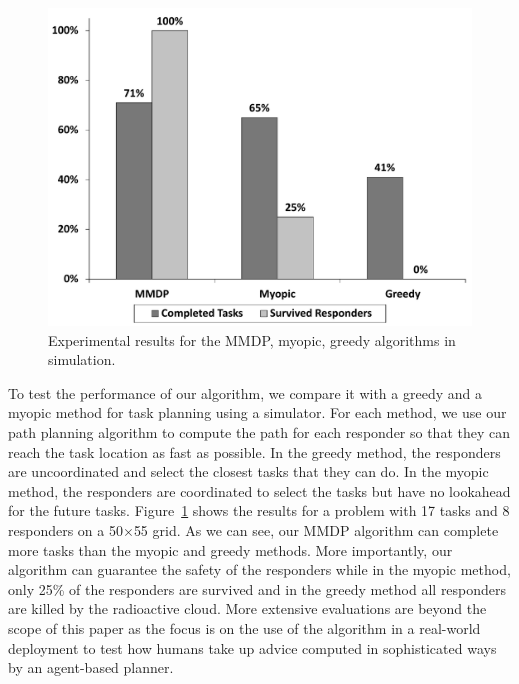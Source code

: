 \begin{figure}[htbp]
  \centering
  \includegraphics[width=0.8\linewidth]{simulation}
  \caption{Experimental results for the MMDP, myopic, greedy
  algorithms in simulation.}
  \label{fig:simulation}
\end{figure}

\noindent To test the performance of our algorithm, we compare it
with a greedy and a myopic method for task planning using a
simulator. For each method, we use our path planning algorithm to
compute the path for each responder so that they can reach the task
location as fast as possible. In the greedy method, the responders
are uncoordinated and select the closest tasks that they can do. In
the myopic method, the responders are coordinated to select the
tasks but have no lookahead for the future tasks.
Figure~\ref{fig:simulation} shows the results for a problem with 17
tasks and 8 responders on a 50$\times$55 grid. As we can see, our
MMDP algorithm can complete more tasks than the myopic and greedy
methods. More importantly, our algorithm can guarantee the safety
of the responders while in the myopic method, only 25\% of the
responders are survived and in the greedy method all responders are
killed by the radioactive cloud. More extensive evaluations are
beyond the scope of this paper as the focus is on the use of the
algorithm in a real-world deployment to test how humans take up
advice computed in sophisticated ways by an agent-based planner.

